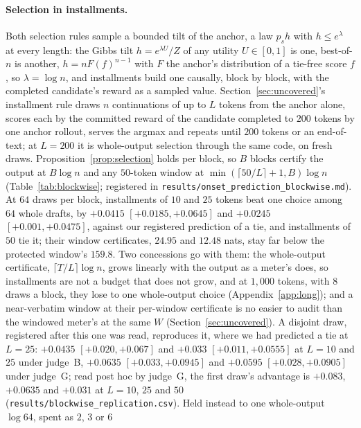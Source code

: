 \paragraph{Selection in installments.}\label{app:blockwise}
Both selection rules sample a bounded tilt of the anchor, a law $p_s h$ with $h \le e^{\lambda}$ at every
length: the Gibbs tilt $h = e^{\lambda U}/Z$ of any utility $U \in [0,1]$ is one, best-of-$n$ is another,
$h = nF(f)^{n-1}$ with $F$ the anchor's distribution of a tie-free score $f$, so $\lambda = \log n$, and
installments build one causally, block by block, with the completed candidate's reward as a sampled
value. Section~\ref{sec:uncovered}'s installment rule draws $n$ continuations of up to $L$ tokens from the anchor
alone, scores each by the committed reward of the candidate completed to $200$ tokens by one anchor
rollout, serves the argmax and repeats until $200$ tokens or an end-of-text; at $L = 200$ it is
whole-output selection through the same code, on fresh draws. Proposition~\ref{prop:selection} holds per
block, so $B$ blocks certify the output at $B\log n$ and any $50$-token window at
$\min(\lceil 50/L\rceil + 1, B)\log n$ (Table~\ref{tab:blockwise}; registered in
\texttt{results/\allowbreak onset\_\allowbreak prediction\_\allowbreak blockwise.md}). At $64$ draws per block,
installments of $10$ and $25$ tokens beat one choice among $64$ whole drafts, by $+0.0415$
$[+0.0185, +0.0645]$ and $+0.0245$ $[+0.001, +0.0475]$, against our registered prediction of a tie, and
installments of $50$ tie it; their window certificates, $24.95$ and $12.48$ nats, stay far below the
protected window's $159.8$. Two concessions go with them: the whole-output certificate, $\lceil T/L\rceil\log n$, grows linearly with the output as a meter's does, so installments are not a budget that does not grow, and at $1{,}000$ tokens, with $8$ draws a block, they lose to one
whole-output choice (Appendix~\ref{app:long}); and a near-verbatim window at their per-window certificate is no easier to audit than the windowed meter's at the same $W$ (Section~\ref{sec:uncovered}). A disjoint draw, registered after this one was read, reproduces it, where we had predicted a tie
at $L = 25$: $+0.0435$
$[+0.020, +0.067]$ and $+0.033$ $[+0.011, +0.0555]$ at $L = 10$ and $25$ under judge~B, $+0.0635$ $[+0.033,
+0.0945]$ and $+0.0595$ $[+0.028, +0.0905]$ under judge~G; read post hoc by judge~G, the first draw's
advantage is $+0.083$, $+0.0635$ and $+0.031$ at $L = 10$, $25$ and $50$
(\texttt{results/\allowbreak blockwise\_\allowbreak replication.csv}). Held instead to one whole-output $\log 64$, spent as $2$, $3$ or $6$

